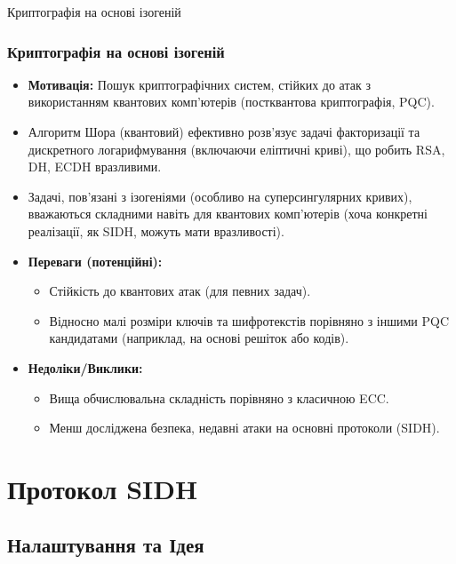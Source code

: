 \documentclass[9pt]{beamer}
\begin{document}
\begin{darkframes}
\begin{frame}{Криптографія на основі ізогеній}
  \frametitle{Криптографія на основі ізогеній}
  \begin{itemize}
    \item \textbf{Мотивація:} Пошук криптографічних систем, стійких до атак з використанням квантових комп'ютерів (постквантова криптографія, PQC).
    \item Алгоритм Шора (квантовий) ефективно розв'язує задачі факторизації та дискретного логарифмування (включаючи еліптичні криві), що робить RSA, DH, ECDH вразливими.
    \item Задачі, пов'язані з ізогеніями (особливо на суперсингулярних кривих), вважаються складними навіть для квантових комп'ютерів (хоча конкретні реалізації, як SIDH, можуть мати вразливості).
    \item \textbf{Переваги (потенційні):}
      \begin{itemize}
        \item Стійкість до квантових атак (для певних задач).
        \item Відносно малі розміри ключів та шифротекстів порівняно з іншими PQC кандидатами (наприклад, на основі решіток або кодів).
      \end{itemize}
    \item \textbf{Недоліки/Виклики:}
      \begin{itemize}
        \item Вища обчислювальна складність порівняно з класичною ECC.
        \item Менш досліджена безпека, недавні атаки на основні протоколи (SIDH).
      \end{itemize}
  \end{itemize}
\end{frame}

\section{Протокол SIDH}
\subsection{Налаштування та Ідея} %


\end{darkframes}
\end{document}
